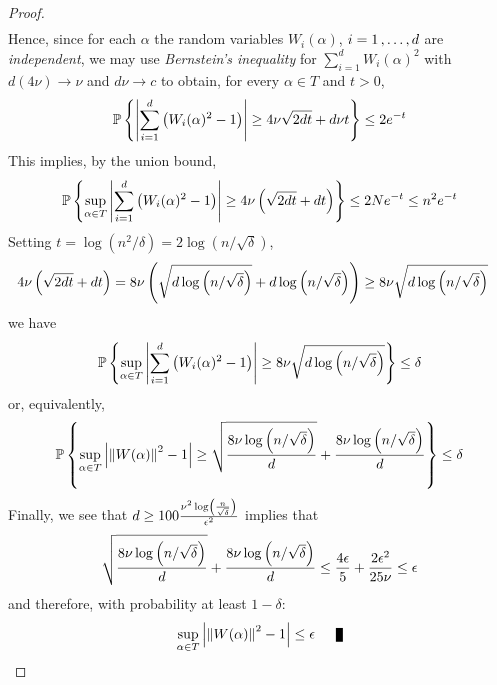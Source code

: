 \documentclass[11pt]{article}
\begin{document}
\begin{itemize}
\begin{proof}
\begin{align*}
\end{align*} Hence, since for each $\alpha$ the random variables $W_i(\alpha)$, $i = 1 \,{,}\ldots{,}\, d$ are \emph{independent}, we may use \emph{Bernstein's inequality} for $\sum_{i=1}^d W_i(\alpha)^2$ with $d(4\nu) \to \nu$ and $d\nu \to c$ to obtain, for every $\alpha \in T$ and $t > 0$, 
\begin{align*}
{\mathbb P}\left\{\left\lvert \sum_{i=1}^d \left(W_i(\alpha)^2 - 1\right)  \right\rvert \ge  4\nu\sqrt{2 d t} + d\nu t \right\} \le 2 e^{-t}
\end{align*} This implies, by the union bound,
\begin{align*}
{\mathbb P}\left\{\sup_{\alpha \in T}\left\lvert \sum_{i=1}^d \left(W_i(\alpha)^2 - 1\right)  \right\rvert \ge 4\nu\left(\sqrt{2 d t} + d t\right) \right\} \le 2 N e^{-t} \le n^2 e^{-t}
\end{align*} Setting $t = \log (n^2/\delta)= 2\log(n/\sqrt{\delta})$, 
\begin{align*}
4\nu\left(\sqrt{2 d t} + d t\right)  &= 8\nu\left(\sqrt{d \log\left(n/\sqrt{\delta}\right)} + d\log\left(n/\sqrt{\delta}\right) \right) \ge 8\nu\sqrt{d \log\left(n/\sqrt{\delta}\right)}
\end{align*}
we have
\begin{align*}
{\mathbb P}\left\{\sup_{\alpha \in T}\left\lvert \sum_{i=1}^d \left(W_i(\alpha)^2 - 1\right)  \right\rvert \ge 8\nu\sqrt{d \log\left(n/\sqrt{\delta}\right)}\right\} \le \delta
\end{align*} or, equivalently,
\begin{align*}
{\mathbb P}\left\{\sup_{\alpha \in T}\left\lvert \left\|W(\alpha)\right\|_{}^2 - 1 \right\rvert \ge \sqrt{\frac{ 8\nu\log\left(n/\sqrt{\delta}\right)}{d}} + \frac{ 8\nu\log\left(n/\sqrt{\delta}\right)}{d} \right\} \le \delta
\end{align*} Finally, we see that $d \ge 100 \frac{\nu^2  \log \left(\frac{n}{\sqrt{\delta}}\right)}{\epsilon^2}$ implies that
\begin{align*}
\sqrt{\frac{ 8\nu\log\left(n/\sqrt{\delta}\right)}{d}} + \frac{ 8\nu\log\left(n/\sqrt{\delta}\right)}{d} \le \frac{4\epsilon}{5} + \frac{2\epsilon^2}{25 \nu} \le \epsilon
\end{align*} and therefore, with probability at least $1 - \delta$:
\begin{align*}
\sup_{\alpha \in T}\abs{\norm{W(\alpha)}{}^2 - 1} \le \epsilon \qed
\end{align*}
\end{proof}
\end{itemize}

\newpage


\end{document}
